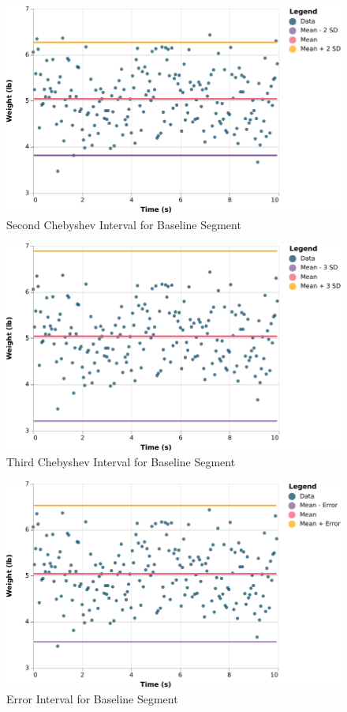 \begin{figure}
    \centering
    \includegraphics{chart/00-intro/baseline-chebyshev-2.pdf}
    \caption{Second Chebyshev Interval for Baseline Segment}
    \label{figure.00.baseline.chebyshev.2}
\end{figure}
\begin{figure}
    \centering
    \includegraphics{chart/00-intro/baseline-chebyshev-3.pdf}
    \caption{Third Chebyshev Interval for Baseline Segment}
    \label{figure.00.baseline.chebyshev.3}
\end{figure}
\begin{figure}
    \centering
    \includegraphics{chart/00-intro/baseline-error-interval.pdf}
    \caption{Error Interval for Baseline Segment}
    \label{figure.00.baseline.interval}
\end{figure}
